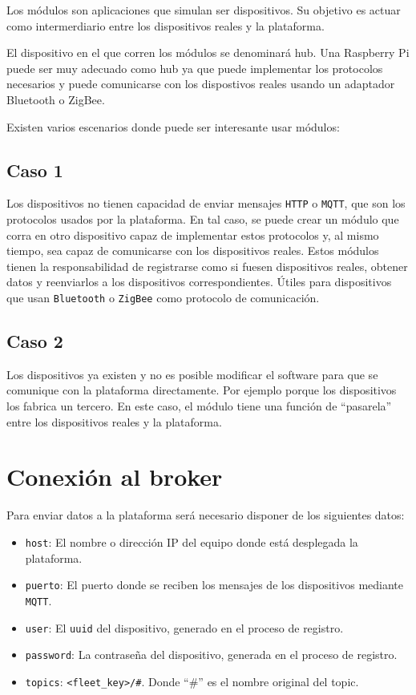 Los módulos son aplicaciones que simulan ser dispositivos. Su objetivo es actuar
como intermerdiario entre los dispositivos reales y la plataforma.

El dispositivo en el que corren los módulos se denominará hub. Una Raspberry Pi
puede ser muy adecuado como hub ya que puede implementar los protocolos
necesarios y puede comunicarse con los dispostivos reales usando un adaptador
Bluetooth o ZigBee.

Existen varios escenarios donde puede ser interesante usar módulos:

\subsection{Caso 1}
Los dispositivos no tienen capacidad de enviar mensajes \texttt{HTTP} o \texttt{MQTT}, que son los
protocolos usados por la plataforma. En tal caso, se puede crear un módulo que
corra en otro dispositivo capaz de implementar estos protocolos y, al mismo
tiempo, sea capaz de comunicarse con los dispositivos reales. Estos módulos
tienen la responsabilidad de registrarse como si fuesen dispositivos reales,
obtener datos y reenviarlos a los dispositivos correspondientes. Útiles para
dispositivos que usan \texttt{Bluetooth} o \texttt{ZigBee} como protocolo de comunicación.

\subsection{Caso 2}
Los dispositivos ya existen y no es posible modificar el software para que se
comunique con la plataforma directamente. Por ejemplo porque los dispositivos
los fabrica un tercero. En este caso, el módulo tiene una función de ``pasarela''
entre los dispositivos reales y la plataforma.

\section{Conexión al broker}

Para enviar datos a la plataforma será necesario disponer de los siguientes datos:

\begin{itemize}\itemsep1pt \parskip0pt 
\item \texttt{host}: El nombre o dirección IP del equipo donde está desplegada la plataforma.
\item \texttt{puerto}: El puerto donde se reciben los mensajes de los dispositivos mediante \texttt{MQTT}.
\item \texttt{user}: El \texttt{uuid} del dispositivo, generado en el proceso de registro.
\item \texttt{password}: La contraseña del dispositivo, generada en el proceso de registro.
\item \texttt{topics}: \texttt{<fleet\_key>/\#}. Donde ``\#'' es el nombre original del topic.
\end{itemize}

